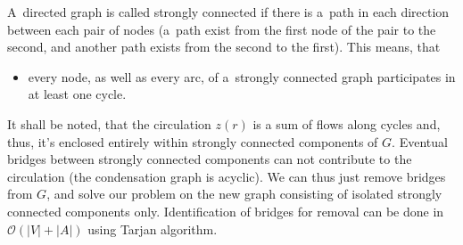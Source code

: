 \documentclass[paper=a4,parskip=half,DIV=12]{leetcode}
\begin{document}
A~directed graph is called strongly connected if there is a~path in each
direction between each pair of nodes (a~path exist from the first node of the
pair to the second, and another path exists from the second to the first). This
means, that
\begin{itemize}
  \item every node, as well as every arc, of a~strongly connected graph
    participates in at least one cycle.
\end{itemize}
It shall be noted, that the circulation $z(r)$ is a sum of flows along cycles
and, thus, it's enclosed entirely within strongly connected components of $G$.
Eventual bridges between strongly connected components can not contribute to
the circulation (the condensation graph is acyclic). We can thus just remove
bridges from $G$, and solve our problem on the new graph consisting of isolated
strongly connected components only. Identification of bridges for removal can
be done in $\mathcal{O}(|V| + |A|)$ using Tarjan algorithm.



\end{document}
